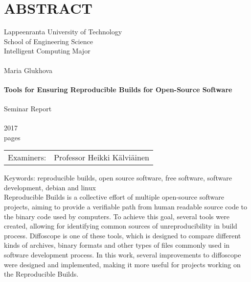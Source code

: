 \section*{ABSTRACT}

Lappeenranta University of Technology\\
School of Engineering Science\\
Intelligent Computing Major\\
\\

Maria Glukhova\\
\\
\textbf{Tools for Ensuring Reproducible Builds for Open-Source Software}\\
\\
Seminar Report\\
\\
2017\\
\pageref{LastPage} pages\\


\begin{tabular}{l p{11.0cm}}  
  
Examiners: & Professor \foreignlanguage{finnish}{Heikki Kälviäinen}

\end {tabular}

Keywords: reproducible builds, open source software, free software, software development, debian and linux\\


Reproducible Builds is a collective effort of multiple open-source software
projects, aiming to provide a verifiable path from human readable source code
to the binary code used by computers. To achieve this goal, several tools were
created, allowing for identifying common sources of unreproducibility in build
process.
Diffoscope is one of these tools, which is designed to compare different kinds of
archives, binary formats and other types of files commonly used in software
development process. In this work, several improvements to diffoscope were
designed and implemented, making it more useful for projects working on the
Reproducible Builds.\\
